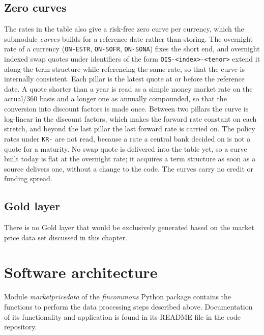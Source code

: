 \subsection{Zero curves}

The rates in the table also give a risk-free zero curve per currency, which the submodule \emph{curves} builds for a reference date rather than storing. The overnight rate of a currency (\verb|ON-ESTR|, \verb|ON-SOFR|, \verb|ON-SONA|) fixes the short end, and overnight indexed swap quotes under identifiers of the form \verb|OIS-<index>-<tenor>| extend it along the term structure while referencing the same rate, so that the curve is internally consistent. Each pillar is the latest quote at or before the reference date. A quote shorter than a year is read as a simple money market rate on the actual/360 basis and a longer one as annually compounded, so that the conversion into discount factors is made once. Between two pillars the curve is log-linear in the discount factors, which makes the forward rate constant on each stretch, and beyond the last pillar the last forward rate is carried on. The policy rates under \verb|KR-| are not read, because a rate a central bank decided on is not a quote for a maturity. No swap quote is delivered into the table yet, so a curve built today is flat at the overnight rate; it acquires a term structure as soon as a source delivers one, without a change to the code. The curves carry no credit or funding spread.

\subsection{Gold layer}

There is no Gold layer that would be exclusively generated based on the market price data set discussed in this chapter.

\section{Software architecture}


Module \emph{marketpricedata} of the \emph{fincommons} Python package contains the functions to perform the data processing steps described above. Documentation of its functionality and application is found in its README file in the code repository.

